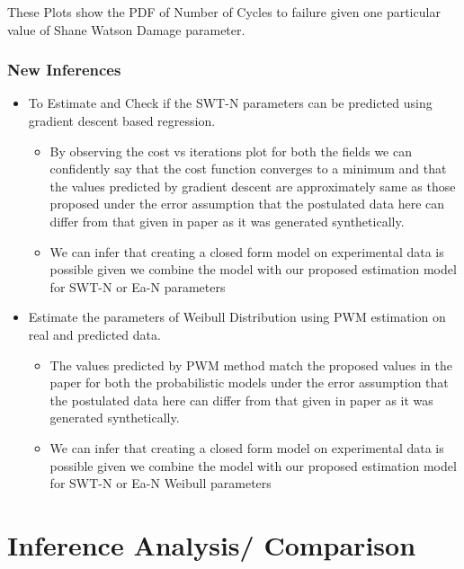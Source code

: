 \documentclass[11pt]{article}
\providecommand{\tightlist}{%
      \setlength{\itemsep}{0pt}\setlength{\parskip}{0pt}}
\begin{document}
These Plots show the PDF of Number of Cycles to failure given one
particular value of Shane Watson Damage parameter.

\hypertarget{new-inferences}{%
\subsubsection{New Inferences}\label{new-inferences}}

\begin{itemize}
\tightlist
\item
  To Estimate and Check if the SWT-N parameters can be predicted using
  gradient descent based regression.

  \begin{itemize}
  \tightlist
  \item
    By observing the cost vs iterations plot for both the fields we can
    confidently say that the cost function converges to a minimum and
    that the values predicted by gradient descent are approximately same
    as those proposed under the error assumption that the postulated
    data here can differ from that given in paper as it was generated
    synthetically.
  \item
    We can infer that creating a closed form model on experimental data
    is possible given we combine the model with our proposed estimation
    model for SWT-N or Ea-N parameters
  \end{itemize}
\item
  Estimate the parameters of Weibull Distribution using PWM estimation
  on real and predicted data.

  \begin{itemize}
  \tightlist
  \item
    The values predicted by PWM method match the proposed values in the
    paper for both the probabilistic models under the error assumption
    that the postulated data here can differ from that given in paper as
    it was generated synthetically.
  \item
    We can infer that creating a closed form model on experimental data
    is possible given we combine the model with our proposed estimation
    model for SWT-N or Ea-N Weibull parameters
  \end{itemize}
\end{itemize}



\hypertarget{inference-analysis-comparison}{%
\section{Inference Analysis/
Comparison}\label{inference-analysis-comparison}}
\end{document}
